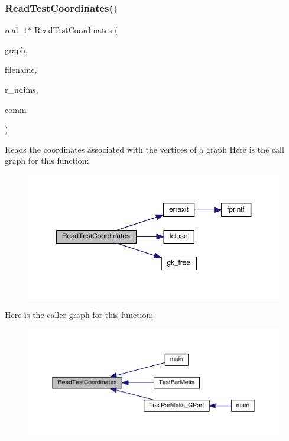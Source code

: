 \subsubsection{\texorpdfstring{Read\+Test\+Coordinates()}{ReadTestCoordinates()}}
{\footnotesize\ttfamily \hyperlink{a00876_a1924a4f6907cc3833213aba1f07fcbe9}{real\+\_\+t}$\ast$ Read\+Test\+Coordinates (\begin{DoxyParamCaption}\item[{\hyperlink{a00734}{graph\+\_\+t} $\ast$}]{graph,  }\item[{char $\ast$}]{filename,  }\item[{\hyperlink{a00876_aaa5262be3e700770163401acb0150f52}{idx\+\_\+t} $\ast$}]{r\+\_\+ndims,  }\item[{M\+P\+I\+\_\+\+Comm}]{comm }\end{DoxyParamCaption})}

Reads the coordinates associated with the vertices of a graph Here is the call graph for this function\+:\nopagebreak
\begin{figure}[H]
\begin{center}
\leavevmode
\includegraphics[width=350pt]{a00954_a612a9ac7e28ee021871b62eec92bed0b_cgraph}
\end{center}
\end{figure}
Here is the caller graph for this function\+:\nopagebreak
\begin{figure}[H]
\begin{center}
\leavevmode
\includegraphics[width=350pt]{a00954_a612a9ac7e28ee021871b62eec92bed0b_icgraph}
\end{center}
\end{figure}
\mbox{\label{a00954_ad576773d5c2e0a0662e8913264b980b1}} 

